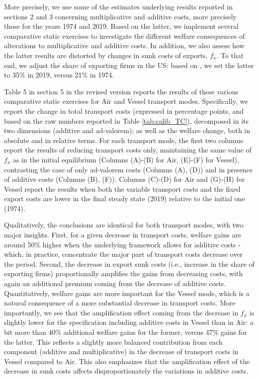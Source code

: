 \documentclass[a4paper,12pt]{article}
\begin{document}
More precisely, we use some of the estimates underlying results reported in sections 2 and 3 concerning multiplicative and additive costs, more precisely those for the years 1974 and 2019. Based on the latter, we implement several comparative static exercises to investigate the different welfare consequences of alterations to multiplicative and additive costs. In addition, we also assess how the latter results are distorted by changes in sunk costs of exports, $f_{x}$. To that end, we adjust the share of exporting firms in the US: based on \citet{Lincoln_McCallum2018}, we set the latter to 35\% in 2019, versus 21\% in 1974.

Table 5 in section 5 in the revised version reports the results of these various comparative static exercises for Air and Vessel transport modes. Specifically, we report the change in total transport costs (expressed in percentage points, and based on the raw numbers reported in Table \ref{tab:calib_TC}), decomposed in its two dimensions (additive and ad-valorem); as well as the welfare change, both in absolute and in relative terms. For each transport mode, the first two columns report the results of reducing transport costs only, maintaining the same value of $f_x$ as in the initial equilibrium (Columns (A)-(B) for Air, (E)-(F) for Vessel), contrasting the case of only ad-valorem costs (Columns (A), (D)) and in presence of additive costs (Columns (B), (F)). Columns (C)-(D) for Air and (G)-(H) for Vessel report the results when both the variable transport costs and the fixed export costs are lower in the final steady state (2019) relative to the initial one (1974).

Qualitatively, the conclusions are identical for both transport modes, with two major insights. First, for a given decrease in transport costs,  welfare gains are around 50\% higher when the underlying framework allows for additive costs - which, in practice, concentrate the major part of transport costs decrease over the period. Second, the decrease in export sunk costs (i.e., increase in the share of exporting firms) proportionally amplifies the gains from decreasing costs, with again an additional premium coming from the decrease of additive costs. Quantitatively, welfare gains are more important for the Vessel mode, which is a natural consequence of a more substantial decrease in transport costs. More importantly, we see that the amplification effect coming from the decrease in $f_{x}$ is slightly lower for the specification including additive costs  in Vessel than in Air: a bit more than 40\% additional welfare gains for the former, versus 47\% gains for the latter. This reflects a slightly more balanced contribution from each component (additive and multiplicative) in the decrease of transport costs in Vessel compared to Air. This also emphasizes that the amplification effect of the decrease in sunk costs affects disproportionately the variations in additive costs.
\end{document}
